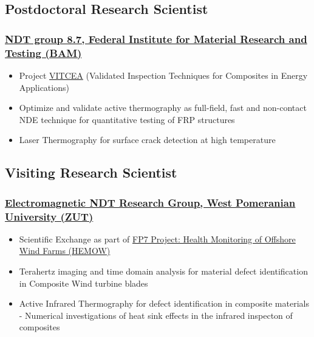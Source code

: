\documentclass{my_cv}%
\begin{document}
\subsection{Postdoctoral Research Scientist}
\subsubsection{\href{https://www.bam.de/Navigation/DE/Home/home.html}{NDT group 8.7, Federal Institute for Material Research and Testing (BAM)}}
\begin{itemize}[leftmargin=0.15in]
\setlength\itemsep{-0.1em}
\color{mygray}
\item Project \href{http://projects.npl.co.uk/vitcea/}{VITCEA} (Validated Inspection Techniques for Composites in Energy Applications) 
\item Optimize and validate active thermography as full-field, fast and non-contact NDE technique for quantitative testing of FRP structures 
\item Laser Thermography for surface crack detection at high temperature 
\end{itemize}
{\color{mygray1} \hdashrule[0.1ex]{18.8cm}{0.2mm}{1mm}}
\subsection{Visiting Research Scientist}
\subsubsection{\href{https://innowacje.zut.edu.pl/cooperationoffer/electromagnetic-methods-non-destructive-testing}{Electromagnetic NDT Research Group, West Pomeranian University (ZUT)}}
\begin{itemize}[leftmargin=0.15in]
\setlength\itemsep{-0.1em}
\color{mygray}
\item Scientific Exchange as part of \href{https://cordis.europa.eu/project/id/269202/results}{FP7 Project: Health Monitoring of Offshore Wind Farms (HEMOW)}
\item Terahertz imaging and time domain analysis for material defect identification in Composite Wind turbine blades 
\item Active Infrared Thermography for defect identification in composite materials - Numerical investigations of heat sink effects in the infrared inspecton of composites 
\end{itemize}
{\color{mygray1} \hdashrule[0.1ex]{18.8cm}{0.2mm}{1mm}}
\end{document}
